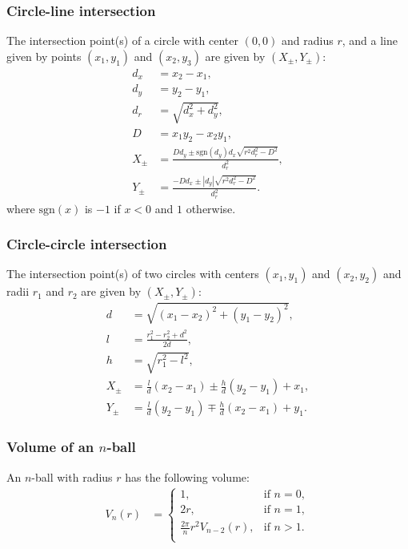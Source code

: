 \subsubsection{Circle-line intersection}
The intersection point(s) of a circle with center $(0, 0)$ and radius $r$, and a line given by points $(x_1, y_1)$ and $(x_2, y_3)$ are given by $(X_\pm, Y_\pm)$:
\begin{align*}
    d_x &= x_2 - x_1, \\
    d_y &= y_2 - y_1, \\
    d_r &= \sqrt{d_x^2 + d_y^2}, \\
    D &= x_1y_2 - x_2y_1, \\
    X_\pm &= \frac{Dd_y \pm \text{sgn}(d_y)d_x\sqrt{r^2d_r^2 - D^2}}{d_r^2}, \\
    Y_\pm &= \frac{-Dd_x \pm |d_y|\sqrt{r^2d_r^2 - D^2}}{d_r^2}.
\end{align*}
where $\text{sgn}(x)$ is $-1$ if $x < 0$ and $1$ otherwise.

\subsubsection{Circle-circle intersection}
The intersection point(s) of two circles with centers $(x_1, y_1)$ and $(x_2, y_2)$ and radii $r_1$ and $r_2$ are given by $(X_\pm, Y_\pm)$:
\begin{align*}
    d &= \sqrt{(x_1 - x_2)^2 + (y_1 - y_2)^2}, \\
    l &= \frac{r_1^2 - r_2^2 + d^2}{2d}, \\
    h &= \sqrt{r_1^2 - l^2}, \\
    X_\pm &= \frac ld(x_2 - x_1) \pm \frac hd (y_2 - y_1) + x_1, \\
    Y_\pm &= \frac ld(y_2 - y_1) \mp \frac hd(x_2 - x_1) + y_1.
\end{align*}

\subsubsection{Volume of an $n$-ball}
An $n$-ball with radius $r$ has the following volume:
\begin{align*}
    V_n(r) &= \left\{\begin{array}{ll}
        1, & \text{if }n = 0, \\
        2r, & \text{if }n = 1, \\
        \frac{2\pi}n r^2 V_{n-2}(r), & \text{if }n > 1. \\
    \end{array}\right.
\end{align*}

